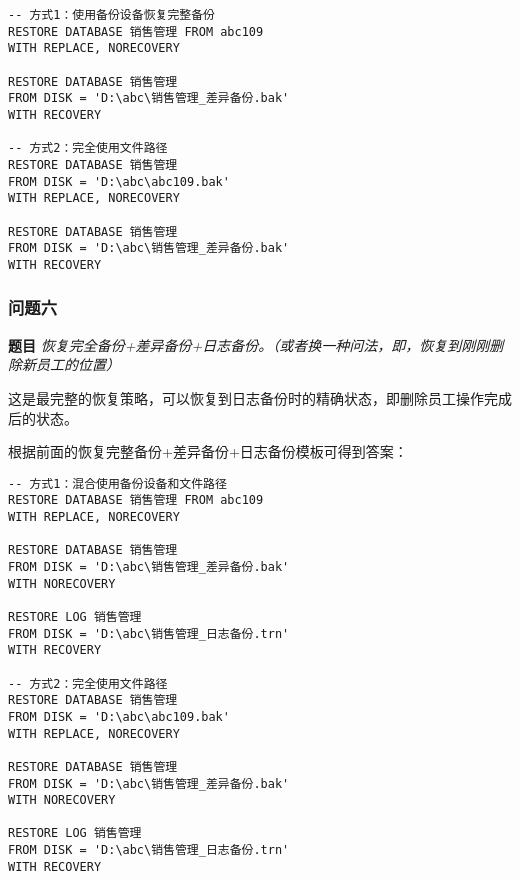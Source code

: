 \begin{mdframed}[backgroundcolor=blue!5]
\begin{verbatim}
-- 方式1：使用备份设备恢复完整备份
RESTORE DATABASE 销售管理 FROM abc109
WITH REPLACE, NORECOVERY

RESTORE DATABASE 销售管理
FROM DISK = 'D:\abc\销售管理_差异备份.bak'
WITH RECOVERY

-- 方式2：完全使用文件路径
RESTORE DATABASE 销售管理
FROM DISK = 'D:\abc\abc109.bak'
WITH REPLACE, NORECOVERY

RESTORE DATABASE 销售管理
FROM DISK = 'D:\abc\销售管理_差异备份.bak'
WITH RECOVERY
\end{verbatim}
\end{mdframed}

\subsubsection{问题六}

\textbf{题目} \emph{恢复完全备份+差异备份+日志备份。（或者换一种问法，即，恢复到刚刚删除新员工的位置）}

\qquad 这是最完整的恢复策略，可以恢复到日志备份时的精确状态，即删除员工操作完成后的状态。

\qquad 根据前面的恢复完整备份+差异备份+日志备份模板可得到答案：

\begin{mdframed}[backgroundcolor=blue!5]
\begin{verbatim}
-- 方式1：混合使用备份设备和文件路径
RESTORE DATABASE 销售管理 FROM abc109
WITH REPLACE, NORECOVERY

RESTORE DATABASE 销售管理
FROM DISK = 'D:\abc\销售管理_差异备份.bak'
WITH NORECOVERY

RESTORE LOG 销售管理
FROM DISK = 'D:\abc\销售管理_日志备份.trn'
WITH RECOVERY

-- 方式2：完全使用文件路径
RESTORE DATABASE 销售管理
FROM DISK = 'D:\abc\abc109.bak'
WITH REPLACE, NORECOVERY

RESTORE DATABASE 销售管理
FROM DISK = 'D:\abc\销售管理_差异备份.bak'
WITH NORECOVERY

RESTORE LOG 销售管理
FROM DISK = 'D:\abc\销售管理_日志备份.trn'
WITH RECOVERY
\end{verbatim}
\end{mdframed}